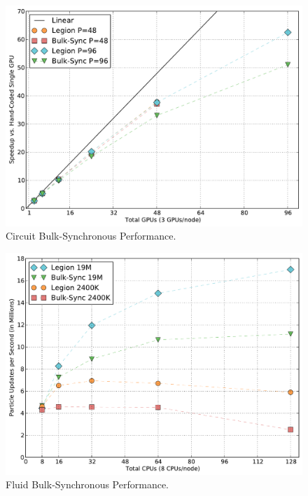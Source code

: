 \begin{figure}
\begin{center}
\includegraphics[scale=0.33]{figs/circuit_bulk_sync.pdf}
\end{center}
\vspace{-6mm}
\caption{Circuit Bulk-Synchronous Performance.\label{fig:cktbulk}}
\vspace{-4mm}
\end{figure}

\begin{figure}
\begin{center}
\includegraphics[scale=0.33]{figs/fluid_bulk_sync.pdf}
\end{center}
\vspace{-6mm}
\caption{Fluid Bulk-Synchronous Performance.\label{fig:fluidbulk}}
\vspace{-4mm}
\end{figure}

